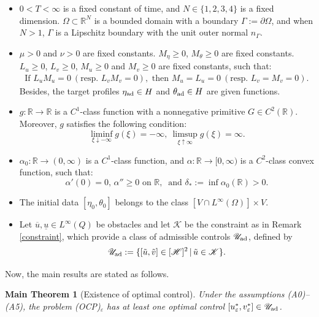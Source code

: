 \documentclass{sinst}
\numberwithin{equation}{section}
\theoremstyle{plain}
\newtheorem{mTh}{Main Theorem}
\theoremstyle{definition}
\def\R{\mathbb{R}}
\def\sH{\mathscr{H}}
\def\sK{\mathscr{K}}
\def\sU{\mathscr{U}}
\def\ad{{\rm ad}}
\begin{document}
\begin{itemize}
  \item[(A0)] $0 < T < \infty$ is a fixed constant of time, and $N \in \{ 1,2,3,4 \}$ is a fixed dimension. $\Omega \subset \R^N$ is a bounded domain with a boundary $\Gamma := \partial\Omega$, and when $N > 1$, $\Gamma$ is a Lipschitz boundary with the unit outer normal $n_\Gamma$. 
  \item[(A1)] $\mu > 0$ and $\nu > 0$ are fixed constants. $M_\eta \geq 0$, $M_\theta \geq 0$ are fixed constants. $L_u \geq 0$, $L_v \geq 0$, $M_u \geq 0$ and $M_v \geq 0$ are fixed constants, such that:
  \begin{align}
    \mbox{If }L_u M_u = 0 \ (\mbox{resp. } L_v M_v = 0), \mbox{ then } M_u = L_u = 0 \ (\mbox{resp. } L_v = M_v = 0).
\end{align}
  Besides, the target profiles $\eta_\ad \in H$ and $\theta_\ad \in H$ are given functions. 
  \item[(A2)] $g: \R \longrightarrow \R$ is a $C^1$-class function with a nonnegative primitive $G \in C^2(\R)$. Moreover, $g$ satisfies the following condition:
  \begin{equation}
    \liminf_{\xi \downarrow -\infty} g(\xi) = -\infty, \ \limsup_{\xi \uparrow \infty} g(\xi) = \infty.
  \end{equation}
  \item[(A3)] $\alpha_0: \R \longrightarrow (0,\infty)$ is a $C^1$-class function, and $\alpha : \R \longrightarrow [0,\infty)$ is a $C^2$-class convex function, such that:
      \begin{equation}
        \alpha'(0) = 0, \, \alpha'' \geq 0 \mbox{ on } \R, \ \mbox{ and } \delta_* := \inf \alpha_0(\R) > 0.
      \end{equation}
  \item[(A4)] The initial data $[\eta_0, \theta_0]$ belongs to the class $[V \cap L^\infty(\Omega)] \times V$.
  \item[(A5)] Let $\overline{u}, \underline{u} \in L^\infty(Q)$ be obstacles and let $\sK$ be the constraint as in Remark \ref{constraint}, which provide a class of admissible controls $\sU_\ad$, defined by
  \begin{equation}
    \sU_\ad := \{ [\tilde u,\tilde v] \in [\sH]^2 \,|\, \tilde u \in \sK \}.
  \end{equation}
\end{itemize}

Now, the main results are stated as follows.
\begin{mTh}[Existence of optimal control] \label{mth1}
  Under the assumptions (A0)--(A5), the problem (OCP)$_\varepsilon$ has at least one optimal control $[u_\varepsilon^*, v_\varepsilon^*] \in \sU_\ad$.
\end{mTh}
\end{document}
